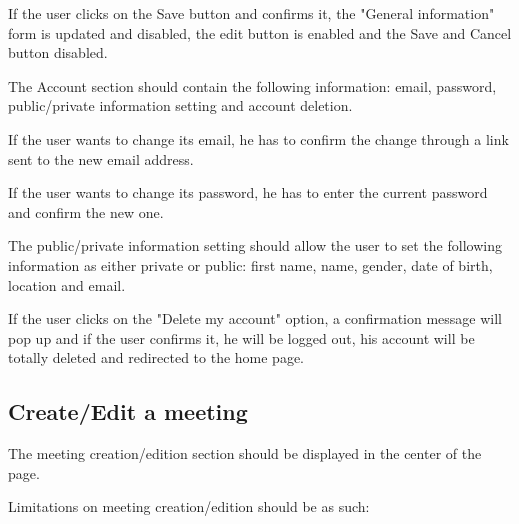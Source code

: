 \documentclass[conference]{IEEEtran}
\begin{document}
If the user clicks on the Save button and confirms it, the "General information" form is updated and disabled, the edit button is enabled and the Save and Cancel button disabled.

The Account section should contain the following information: email, password, public/private information setting and account deletion.

If the user wants to change its email, he has to confirm the change through a link sent to the new email address.

If the user wants to change its password, he has to enter the current password and confirm the new one.

The public/private information setting should allow the user to set the following information as either private or public: first name, name, gender, date of birth, location and email.

If the user clicks on the "Delete my account" option, a confirmation message will pop up and if the user confirms it, he will be logged out, his account will be totally deleted and redirected to the home page.

\subsection{Create/Edit a meeting}

The meeting creation/edition section should be displayed in the center of the page.

Limitations on meeting creation/edition should be as such:
\end{document}
